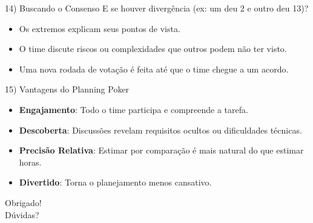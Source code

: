 \documentclass[aspectratio=169]{beamer}
\begin{document}
\begin{frame}{14) Buscando o Consenso}
  E se houver divergência (ex: um deu 2 e outro deu 13)?
  \begin{itemize}
    \item Os extremos explicam seus pontos de vista.
    \item O time discute riscos ou complexidades que outros podem não ter visto.
    \item Uma nova rodada de votação é feita até que o time chegue a um acordo.
  \end{itemize}
\end{frame}

\begin{frame}{15) Vantagens do Planning Poker}
  \begin{itemize}
    \item \textbf{Engajamento}: Todo o time participa e compreende a tarefa.
    \item \textbf{Descoberta}: Discussões revelam requisitos ocultos ou dificuldades técnicas.
    \item \textbf{Precisão Relativa}: Estimar por comparação é mais natural do que estimar horas.
    \item \textbf{Divertido}: Torna o planejamento menos cansativo.
  \end{itemize}
\end{frame}

\begin{frame}
  \centering
  \Huge Obrigado!\\
  \vspace{1cm}
  \large Dúvidas?
\end{frame}
\end{document}
